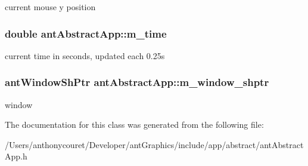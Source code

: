 current mouse y position \hypertarget{classant_abstract_app_a477dd78269fac0a6c2b20aa7fac41426}{
\subsubsection[{m\+\_\+time}]{\setlength{\rightskip}{0pt plus 5cm}double ant\+Abstract\+App\+::m\+\_\+time\hspace{0.3cm}{\ttfamily [protected]}}}\label{classant_abstract_app_a477dd78269fac0a6c2b20aa7fac41426}
current time in seconds, updated each 0.\+25s \hypertarget{classant_abstract_app_a2da8dc7071eb8f76ffe3fae6329439b2}{
\subsubsection[{m\+\_\+window\+\_\+shptr}]{\setlength{\rightskip}{0pt plus 5cm}ant\+Window\+Sh\+Ptr ant\+Abstract\+App\+::m\+\_\+window\+\_\+shptr\hspace{0.3cm}{\ttfamily [protected]}}}\label{classant_abstract_app_a2da8dc7071eb8f76ffe3fae6329439b2}
window 

The documentation for this class was generated from the following file\+:\begin{DoxyCompactItemize}
\item 
/\+Users/anthonycouret/\+Developer/ant\+Graphics/include/app/abstract/ant\+Abstract\+App.\+h\end{DoxyCompactItemize}
